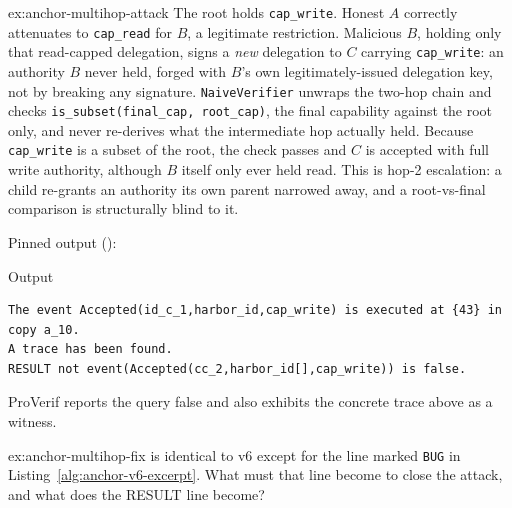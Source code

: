 \documentclass[11pt,a4paper]{article}
\theoremstyle{definition}
\begin{document}
\begin{pdsolution}{ex:anchor-multihop-attack}
The root holds \texttt{cap\_write}. Honest $A$ correctly attenuates to \texttt{cap\_read} for $B$, a legitimate restriction. Malicious $B$, holding only that read-capped delegation, signs a \emph{new} delegation to $C$ carrying \texttt{cap\_write}: an authority $B$ never held, forged with $B$'s own legitimately-issued delegation key, not by breaking any signature. \texttt{NaiveVerifier} unwraps the two-hop chain and checks \texttt{is\_subset(final\_cap, root\_cap)}, the final capability against the root only, and never re-derives what the intermediate hop actually held. Because \texttt{cap\_write} is a subset of the root, the check passes and $C$ is accepted with full write authority, although $B$ itself only ever held read. This is hop-2 escalation: a child re-grants an authority its own parent narrowed away, and a root-vs-final comparison is structurally blind to it.

Pinned output ():
\begin{pdlisting}{Output}{}
\begin{lstlisting}[style=pdoutput]
The event Accepted(id_c_1,harbor_id,cap_write) is executed at {43} in copy a_10.
A trace has been found.
RESULT not event(Accepted(cc_2,harbor_id[],cap_write)) is false.
\end{lstlisting}
\end{pdlisting}
ProVerif reports the query false and also exhibits the concrete trace above as a witness.
\end{pdsolution}
\begin{pdexercise}[kind=Check,rating=1]{ex:anchor-multihop-fix}
 is identical to v6 except for the line marked \texttt{BUG} in Listing~\ref{alg:anchor-v6-excerpt}. What must that line become to close the attack, and what does the RESULT line become?
\end{pdexercise}
\end{document}
